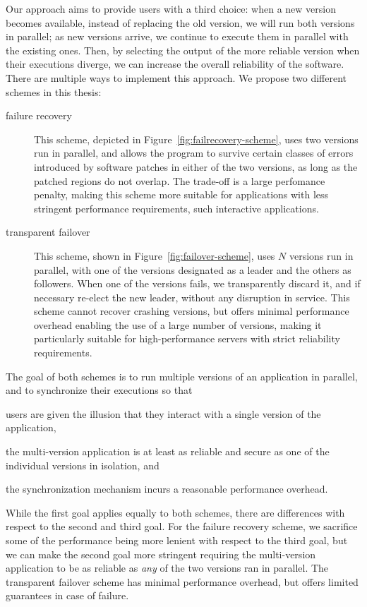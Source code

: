 Our approach aims to provide users with a third choice: when a new version
becomes available, instead of replacing the old version, we will run both
versions in parallel; as new versions arrive, we continue to execute them in
parallel with the existing ones. Then, by selecting the output of the more
reliable version when their executions diverge, we can increase the overall
reliability of the software. There are multiple ways to implement this
approach. We propose two different schemes in this thesis:%
\begin{description}
\item[failure recovery] This scheme, depicted in
  Figure~\ref{fig:failrecovery-scheme}, uses two versions run in parallel, and
  allows the program to survive certain classes of errors introduced by
  software patches in either of the two versions, as long as the patched
  regions do not overlap. The trade-off is a large perfomance penalty, making
  this scheme more suitable for applications with less stringent performance
  requirements, such interactive applications.
\item[transparent failover] This scheme, shown in
  Figure~\ref{fig:failover-scheme}, uses $N$ versions run in parallel, with one
  of the versions designated as a leader and the others as followers. When one
  of the versions fails, we transparently discard it, and if necessary re-elect
  the new leader, without any disruption in service. This scheme cannot recover
  crashing versions, but offers minimal performance overhead enabling the use
  of a large number of versions, making it particularly suitable for
  high-performance servers with strict reliability requirements.
\end{description}

The goal of both schemes is to run multiple versions of an application in
parallel, and to synchronize their executions so that%
\begin{inparaenum}[(1)]
\item users are given the illusion that they interact with a single version of
  the application,
\item the multi-version application is at least as reliable and secure as one
  of the individual versions in isolation, and
\item the synchronization mechanism incurs a reasonable performance overhead.
\end{inparaenum}
While the first goal applies equally to both schemes, there are differences
with respect to the second and third goal. For the failure recovery scheme, we
sacrifice some of the performance being more lenient with respect to the third
goal, but we can make the second goal more stringent requiring the
multi-version application to be as reliable as \emph{any} of the two versions
ran in parallel. The transparent failover scheme has minimal performance
overhead, but offers limited guarantees in case of failure.

